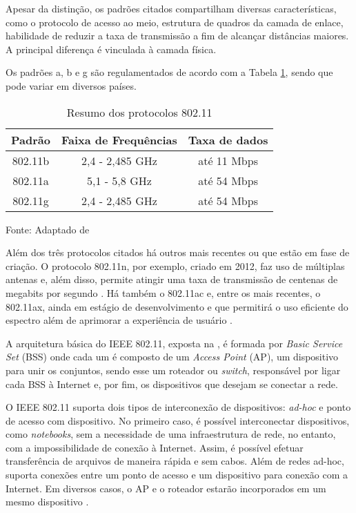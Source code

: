 Apesar da distinção, os padrões citados compartilham diversas características, como o protocolo de acesso ao meio, estrutura de quadros da camada de enlace, habilidade de reduzir a taxa de transmissão a fim de alcançar distâncias maiores. A principal diferença é vinculada à camada física.

Os padrões a, b e g são regulamentados de acordo com a Tabela \ref{tab:ieee80211abg-phy}, sendo que pode variar em diversos países.

\begin{table}[htb]
    \caption{Resumo dos protocolos 802.11}
    \label{tab:ieee80211abg-phy}
    \begin{tabular}{@{}ccc@{}}
        \toprule
        \textbf{Padrão} & \textbf{Faixa de Frequências} & \textbf{Taxa de dados} \\ \midrule
        802.11b         & 2,4 - 2,485 GHz               & até 11 Mbps            \\
        802.11a         & 5,1 - 5,8 GHz                 & até 54 Mbps            \\
        802.11g         & 2,4 - 2,485 GHz               & até 54 Mbps            \\ \bottomrule 
        \end{tabular}
        
    Fonte: Adaptado de 
\end{table}

Além dos três protocolos citados há outros mais recentes ou que estão em fase de criação. O protocolo 802.11n, por exemplo, criado em 2012, faz uso de múltiplas antenas e, além disso, permite atingir uma taxa de transmissão de centenas de megabits por segundo \cite{Kurose2012}. Há também o 802.11ac e, entre os mais recentes, o 802.11ax, ainda em estágio de desenvolvimento e que permitirá o uso eficiente do espectro além de aprimorar a experiência de usuário \cite{Afaqui2017}.

A arquitetura básica do IEEE 802.11, exposta na , é formada por \textit{Basic Service Set} (BSS) onde cada um é composto de um \textit{Access Point} (AP), um dispositivo para unir os conjuntos, sendo esse um roteador ou \textit{switch}, responsável por ligar cada BSS à Internet e, por fim, os dispositivos que desejam se conectar a rede.


O IEEE 802.11 suporta dois tipos de interconexão de dispositivos: \textit{ad-hoc} e ponto de acesso com dispositivo. No primeiro caso, é possível interconectar dispositivos, como \textit{notebooks}, sem a necessidade de uma infraestrutura de rede, no entanto, com a impossibilidade de conexão à Internet. Assim, é possível efetuar transferência de arquivos de maneira rápida e sem cabos. Além de redes ad-hoc, suporta conexões entre um ponto de acesso e um dispositivo para conexão com a Internet. Em diversos casos, o AP e o roteador estarão incorporados em um mesmo dispositivo \cite{Kurose2012}.

